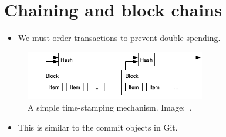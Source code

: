 \section[Chaining]{Chaining and block chains}

\begin{frame}
  \begin{remark}
    \begin{itemize}
      \item We must order transactions to prevent double spending.
    \end{itemize}
  \end{remark}
\end{frame}

\begin{frame}
  \begin{figure}
    \includegraphics[width=0.7\textwidth]{fig/bitcoin-stamp.png}
    \caption{A simple time-stamping mechanism.
    Image:~\cite{Nakamoto2008bap}.}
  \end{figure}

  \pause

  \begin{remark}
    \begin{itemize}
      \item This is similar to the commit objects in Git.
    \end{itemize}
  \end{remark}
\end{frame}


